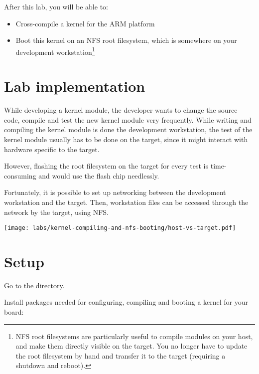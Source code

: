 
After this lab, you will be able to:
\begin{itemize}

\item Cross-compile a kernel for the ARM platform

\item Boot this kernel on an NFS root filesystem, which is somewhere
on your development workstation\footnote{NFS root filesystems are
particularly useful to compile modules on your host, and make them
directly visible on the target. You no longer have to update the root
filesystem by hand and transfer it to the target (requiring a shutdown
and reboot).}

\end{itemize}

\section{Lab implementation}

While developing a kernel module, the developer wants to change the
source code, compile and test the new kernel module very
frequently. While writing and compiling the kernel module is done the
development workstation, the test of the kernel module usually has to
be done on the target, since it might interact with hardware specific
to the target.

However, flashing the root filesystem on the target for every test is
time-consuming and would use the flash chip needlessly.

Fortunately, it is possible to set up networking between the
development workstation and the target. Then, workstation files can be
accessed through the network by the target, using NFS.

\begin{center}
\texttt{[image: labs/kernel-compiling-and-nfs-booting/host-vs-target.pdf]}
\end{center}

\section{Setup}

Go to the  directory.

Install packages needed for configuring, compiling and booting
a kernel for your board:

